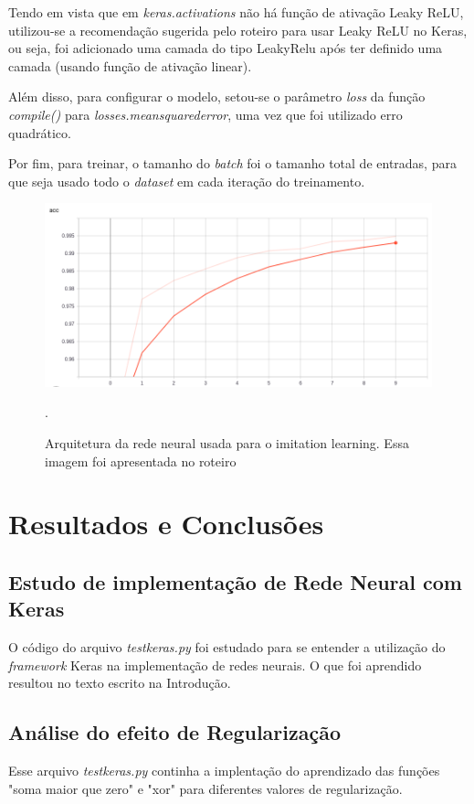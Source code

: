 \documentclass[conference]{IEEEtran}
\begin{document}
Tendo em vista que em \textit{keras.activations} não há função de ativação Leaky ReLU, utilizou-se a recomendação sugerida pelo roteiro \cite{roteiro} para usar Leaky ReLU no Keras, ou seja, foi adicionado uma camada do tipo LeakyRelu após ter definido uma camada (usando função de ativação linear).

Além disso, para configurar o modelo, setou-se o parâmetro \textit{loss} da função \textit{compile()} para \textit{losses.mean\underline{\space}squared\underline{\space}error}, uma vez que foi utilizado erro quadrático.

Por fim, para treinar, o tamanho do \textit{batch} foi o tamanho total de entradas, para que seja usado todo o \textit{dataset} em cada iteração do treinamento.

\begin{figure}[htbp]
\centerline{\includegraphics[scale=0.25]{imagens/acc.png}}
\caption{Arquitetura da rede neural usada para o imitation learning. Essa imagem foi apresentada no roteiro \cite{roteiro}}.
\label{acc}
\end{figure}

\section{Resultados e Conclusões}

\subsection{Estudo de implementação de Rede Neural com Keras}
O código do arquivo \textit{test\underline{\space}keras.py} foi estudado para se entender a utilização do \textit{framework} Keras na implementação de redes neurais. O que foi aprendido resultou no texto escrito na Introdução.

\subsection{Análise do efeito de Regularização}
Esse arquivo \textit{test\underline{\space}keras.py} continha a implentação do aprendizado das funções "soma maior que zero" e "xor" para diferentes valores de regularização.
\end{document}
